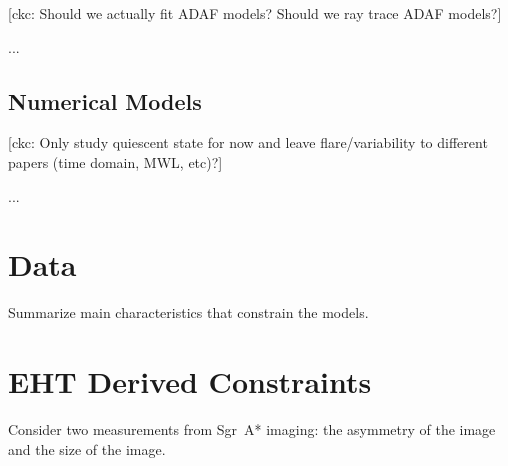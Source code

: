 \documentclass[twocolumn,tighten,dvipsnames]{aastex63}
\newcommand\sgra{Sgr~A*\xspace}
\newcommand\<{{\langle}}
\renewcommand\>{{\rangle}} %
\newcommand\ckc[1]{{\color{MidnightBlue}[ckc: #1]}}
\begin{document}
\ckc{Should we actually fit ADAF models?  Should we ray trace ADAF models?}

...

\subsection{Numerical Models}
\label{sec:numodels}

\ckc{Only study quiescent state for now and leave flare/variability to
  different papers (time domain, MWL, etc)?}


...

\section{Data}


Summarize main characteristics that constrain the models.

\section{EHT Derived Constraints}
\label{sec:ehtconst}

Consider two measurements from \sgra imaging: the asymmetry of the image and the size of the image.
\end{document}
